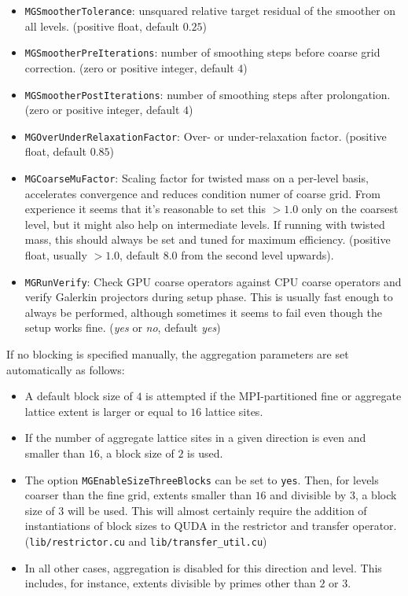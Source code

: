 \begin{itemize}
  \item{ \texttt{MGSmootherTolerance}: unsquared relative target residual of the smoother on all levels. (positive float, default $0.25$) }
  \item{ \texttt{MGSmootherPreIterations}: number of smoothing steps before coarse grid correction. (zero or positive integer, default $4$)}
  \item{ \texttt{MGSmootherPostIterations}: number of smoothing steps after prolongation. (zero or positive integer, default $4$)}
  \item{ \texttt{MGOverUnderRelaxationFactor}: Over- or under-relaxation factor. (positive float, default $0.85$)}
  \item{ \texttt{MGCoarseMuFactor}: Scaling factor for twisted mass on a per-level basis, accelerates convergence and reduces condition numer of coarse grid. From experience it seems that it's reasonable to set this $>1.0$ only on the coarsest level, but it might also help on intermediate levels. If running with twisted mass, this should always be set and tuned for maximum efficiency. (positive float, usually $ > 1.0$, default $8.0$ from the second level upwards).}
  \item{ \texttt{MGRunVerify}: Check GPU coarse operators against CPU coarse operators and verify Galerkin projectors during setup phase. This is usually fast enough to always be performed, although sometimes it seems to fail even though the setup works fine. (\emph{yes} or \emph{no}, default \emph{yes}) } 
\end{itemize}

If no blocking is specified manually, the aggregation parameters are set automatically as follows:
\begin{itemize}
  \item{ A default block size of $4$ is attempted if the MPI-partitioned fine or aggregate lattice extent is larger or equal to $16$ lattice sites. }
  \item{ If the number of aggregate lattice sites in a given direction is even and smaller than $16$, a block size of $2$ is used. }
  \item{ The option \texttt{MGEnableSizeThreeBlocks} can be set to \texttt{yes}. Then, for levels coarser than the fine grid, extents smaller than $16$ and divisible by $3$, a block size of $3$ will be used. This will almost certainly require the addition of instantiations of block sizes to QUDA in the restrictor and transfer operator. (\texttt{lib/restrictor.cu} and \texttt{lib/transfer\_util.cu}) }
  \item{ In all other cases, aggregation is disabled for this direction and level. This includes, for instance, extents divisible by primes other than $2$ or $3$. }
\end{itemize}


